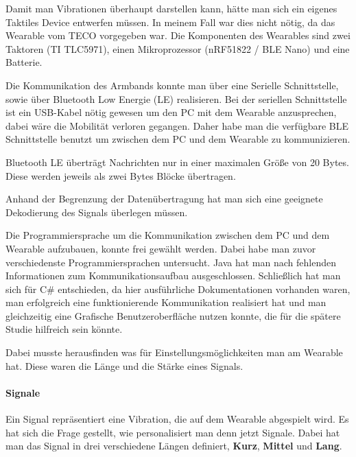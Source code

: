 Damit man Vibrationen {\"u}berhaupt darstellen kann, h{\"a}tte man sich ein eigenes Taktiles Device entwerfen m{\"u}ssen. In meinem Fall war dies nicht n{\"o}tig, da das Wearable vom TECO vorgegeben war. Die Komponenten des Wearables sind zwei Taktoren (TI TLC5971), einen Mikroprozessor (nRF51822 / BLE Nano) und eine Batterie.

Die Kommunikation des Armbands konnte man {\"u}ber eine Serielle Schnittstelle, sowie {\"u}ber Bluetooth Low Energie (LE) realisieren.
Bei der seriellen Schnittstelle ist ein USB-Kabel n{\"o}tig gewesen um den PC mit dem Wearable anzusprechen, dabei w{\"a}re die Mobilit{\"a}t verloren gegangen. Daher habe man die verf{\"u}gbare BLE Schnittstelle benutzt um zwischen dem PC und dem Wearable zu kommunizieren. 

Bluetooth LE {\"u}bertr{\"a}gt Nachrichten nur in einer maximalen Gr{\"o}{\ss}e von 20 Bytes. Diese werden jeweils als zwei Bytes Bl{\"o}cke {\"u}bertragen. 

Anhand der Begrenzung der Daten{\"u}bertragung hat man sich eine geeignete Dekodierung des Signals {\"u}berlegen m{\"u}ssen. 

Die Programmiersprache um die Kommunikation zwischen dem PC und dem Wearable aufzubauen, konnte frei gew{\"a}hlt werden. 
Dabei habe man zuvor verschiedenste Programmiersprachen untersucht. 
Java hat man nach fehlenden Informationen zum Kommunikationsaufbau ausgeschlossen.
Schließlich hat man sich f{\"u}r C\# entschieden, da hier ausführliche Dokumentationen vorhanden waren, man erfolgreich eine funktionierende Kommunikation realisiert hat und man gleichzeitig eine Grafische Benutzeroberfl{\"a}che nutzen konnte, die für die spätere Studie hilfreich sein könnte.

Dabei musste herausfinden was f{\"u}r Einstellungsm{\"o}glichkeiten man am Wearable hat. Diese waren die L{\"a}nge und die St{\"a}rke eines Signals.

\paragraph{Signale}

Ein Signal repr{\"a}sentiert eine Vibration, die auf dem Wearable abgespielt wird. Es hat sich die Frage gestellt, wie personalisiert man denn jetzt Signale. Dabei hat man das Signal in drei verschiedene L{\"a}ngen definiert, \textbf{Kurz}, \textbf{Mittel} und \textbf{Lang}. 


